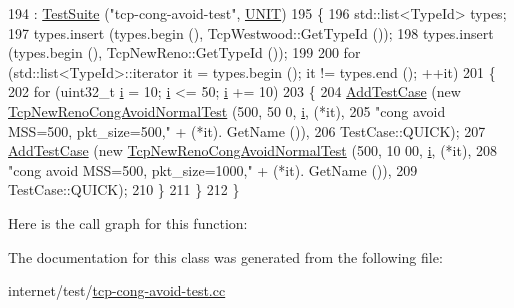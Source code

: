 \begin{DoxyCode}
194                                : \hyperlink{classns3_1_1TestSuite_a904b0c40583b744d30908aeb94636d1a}{TestSuite} (\textcolor{stringliteral}{"tcp-cong-avoid-test"}, \hyperlink{classns3_1_1TestSuite_a1ebfcab34ec8161e085e8e3a1855eae0a3885375a3787abf60431f8454b3cadbd}{UNIT})
195   \{
196     std::list<TypeId> types;
197     types.insert (types.begin (), TcpWestwood::GetTypeId ());
198     types.insert (types.begin (), TcpNewReno::GetTypeId ());
199 
200     \textcolor{keywordflow}{for} (std::list<TypeId>::iterator it = types.begin (); it != types.end (); ++it)
201       \{
202         \textcolor{keywordflow}{for} (uint32\_t \hyperlink{bernuolliDistribution_8m_a6f6ccfcf58b31cb6412107d9d5281426}{i} = 10; \hyperlink{bernuolliDistribution_8m_a6f6ccfcf58b31cb6412107d9d5281426}{i} <= 50; \hyperlink{bernuolliDistribution_8m_a6f6ccfcf58b31cb6412107d9d5281426}{i} += 10)
203           \{
204             \hyperlink{classns3_1_1TestCase_a3718088e3eefd5d6454569d2e0ddd835}{AddTestCase} (\textcolor{keyword}{new} \hyperlink{classTcpNewRenoCongAvoidNormalTest}{TcpNewRenoCongAvoidNormalTest} (500, 50
      0, \hyperlink{bernuolliDistribution_8m_a6f6ccfcf58b31cb6412107d9d5281426}{i}, (*it),
205                                                             \textcolor{stringliteral}{"cong avoid MSS=500, pkt\_size=500,"} + (*it).
      GetName ()),
206                          TestCase::QUICK);
207             \hyperlink{classns3_1_1TestCase_a3718088e3eefd5d6454569d2e0ddd835}{AddTestCase} (\textcolor{keyword}{new} \hyperlink{classTcpNewRenoCongAvoidNormalTest}{TcpNewRenoCongAvoidNormalTest} (500, 10
      00, \hyperlink{bernuolliDistribution_8m_a6f6ccfcf58b31cb6412107d9d5281426}{i}, (*it),
208                                                             \textcolor{stringliteral}{"cong avoid MSS=500, pkt\_size=1000,"} + (*it).
      GetName ()),
209                          TestCase::QUICK);
210           \}
211       \}
212   \}
\end{DoxyCode}


Here is the call graph for this function\+:




The documentation for this class was generated from the following file\+:\begin{DoxyCompactItemize}
\item 
internet/test/\hyperlink{tcp-cong-avoid-test_8cc}{tcp-\/cong-\/avoid-\/test.\+cc}\end{DoxyCompactItemize}
